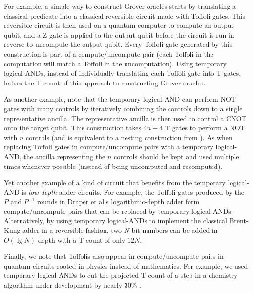 \documentclass[twocolumn]{quantumarticle-customized}
\begin{document}
For example, a simple way to construct Grover oracles starts by translating a classical predicate into a classical reversible circuit made with Toffoli gates.
This reversible circuit is then used on a quantum computer to compute an output qubit, and a Z gate is applied to the output qubit before the circuit is run in reverse to uncompute the output qubit.
Every Toffoli gate generated by this construction is part of a compute/uncompute pair (each Toffoli in the computation will match a Toffoli in the uncomputation).
Using temporary logical-ANDs, instead of individually translating each Toffoli gate into T gates, halves the T-count of this approach to constructing Grover oracles.

As another example, note that the temporary logical-AND can perform NOT gates with many controls by iteratively combining the controls down to a single representative ancilla.
The representative ancilla is then used to control a CNOT onto the target qubit.
This construction takes $4n-4$ T gates to perform a NOT with $n$ controls (and is equivalent to a nesting construction from \cite{Jones2013}).
As when replacing Toffoli gates in compute/uncompute pairs with a temporary logical-AND, the ancilla representing the $n$ controls should be kept and used multiple times whenever possible (instead of being uncomputed and recomputed).

Yet another example of a kind of circuit that benefits from the temporary logical-AND is {\em low-depth} adder circuits.
For example, the Toffoli gates produced by the $P$ and $P^{-1}$ rounds in Draper et al's logarithmic-depth adder \cite{Draper2004} form compute/uncompute pairs that can be replaced by temporary logical-ANDs.
Alternatively, by using temporary logical-ANDs to implement the classical Brent-Kung adder \cite{brent1982} in a reversible fashion, two $N$-bit numbers can be added in $O(\lg N)$ depth with a T-count of only $12N$.

Finally, we note that Toffolis also appear in compute/uncompute pairs in quantum circuits rooted in physics instead of mathematics.
For example, we used temporary logical-ANDs to cut the projected T-count of a step in a chemistry algorithm under development by nearly 30\% \cite{RyanEmails2017}.
\end{document}
